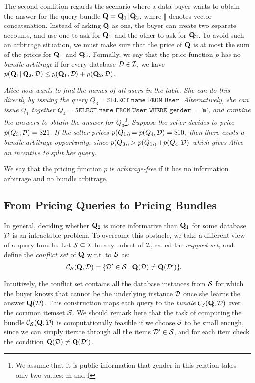  The second condition regards the scenario where a data buyer wants to obtain the answer for the query bundle $\mathbf{Q} = \mathbf{Q}_1\Vert \mathbf{Q}_2$, where $\Vert$ denotes vector concatenation. Instead of asking $\mathbf{Q}$ as one, the buyer can create two separate accounts, and use one to ask for $\mathbf{Q}_1$ and the other to ask for $\mathbf{Q}_2$. To avoid such an arbitrage situation, we must make sure that the price of $\mathbf{Q}$ is at most the sum of the prices for $\mathbf{Q}_1$ and  $\mathbf{Q}_2$. 
%
Formally, we say that the price function $p$ has no {\em bundle arbitrage} if for every database $\mathcal{D} \in \mathcal{I}$, we have $p(\mathbf{Q}_1\Vert \mathbf{Q}_2, \mathcal{D}) \leq p(\mathbf{Q}_1, \mathcal{D}) + p(\mathbf{Q}_2, \mathcal{D})$. 


\begin{example}
	\textit{Alice now wants to find the names of all users in the table. She can do this directly by issuing the query $Q_3 = \texttt{SELECT name FROM User}$.
	Alternatively, she can issue $Q_1$ together $Q_4 = \texttt{SELECT name FROM User WHERE gender = 'm'}$, and combine the answers to obtain the answer for $Q_3$\footnote{We assume that it is public information that gender in this relation takes only two values: \textsf{m} and \textsf{f} }. 
Suppose the seller decides to price $p(Q_3,\mathcal{D}) = \$21$. If the seller prices $p(Q_1,\sb) = p(Q_4,\mathcal{D}) = \$10$, then there exists a bundle arbitrage opportunity, since $p(Q_3,\sb) > p(Q_1,\sb) + p(Q_4,\mathcal{D})$ which gives Alice an incentive to split her query.}
\end{example}

We say that the pricing function $p$ is {\em arbitrage-free} if it has no information arbitrage and no bundle arbitrage. 

\subsection{From Pricing Queries to Pricing Bundles}

In general, deciding whether $\mathbf{Q}_2$ is more informative than $\mathbf{Q}_1$ for some database $\mathcal{D}$ is an intractable problem. To overcome this obstacle, we take a different view of a query bundle. Let 
$\mathcal{S} \subseteq \mathcal{I}$ be any subset of $\mathcal{I}$, called the {\em support set}, and define the {\em conflict set} of $\mathbf{Q}$ w.r.t. to $\mathcal{S}$ as:
%
\begin{align*}
{\mathcal{C}}_{\mathcal{S}}(\mathbf{Q},\mathcal{D})  &= \{{\mathcal{D}' \in \mathcal{S}}\mid{\mathbf{Q}(\mathcal{D}) \neq \mathbf{Q}(\mathcal{D}')}\}. 
\end{align*}

Intuitively, the conflict set contains all the database instances from $\mathcal{S}$ for which the buyer knows that cannot be the underlying instance $\mathcal{D}$ once she learns the answer $\mathbf{Q}(\mathcal{D})$. This construction maps each query to the {\em  bundle} ${\mathcal{C}}_{\mathcal{S}}(\mathbf{Q},\mathcal{D}) $ over the common itemset $\mathcal{S}$. We should remark here that the task of computing the bundle ${\mathcal{C}}_{\mathcal{S}}(\mathbf{Q},\mathcal{D}) $ is computationally feasible if we choose $\mathcal{S}$ to be small enough, since we can simply iterate through all the items $\mathcal{D}' \in \mathcal{S}$, and for each item check the condition 
$\mathbf{Q}(\mathcal{D}) \neq \mathbf{Q}(\mathcal{D}')$.

